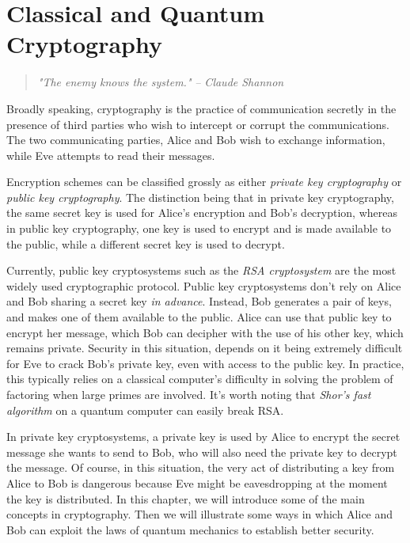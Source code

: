 
\chapter{Classical and Quantum Cryptography} %

\label{Chapter5-cryptography} %


\begin{quote}
\textit{"The enemy knows the system."} 
\bigskip
\hfill \textit{-- Claude Shannon}
\end{quote}

Broadly speaking, cryptography is the practice of communication secretly in the presence of third parties who wish to intercept or corrupt the communications. The two communicating parties, Alice and Bob wish to exchange information, while Eve attempts to read their messages.

Encryption schemes can be classified grossly as either \emph{private key cryptography} or \emph{public key cryptography}. The distinction being that in private key cryptography, the same secret key is used for Alice's encryption and Bob's decryption, whereas in public key cryptography, one key is used to encrypt and is made available to the public, while a different secret key is used to decrypt.

Currently, public key cryptosystems such as the \emph{RSA cryptosystem} are the most widely used cryptographic protocol.  Public key cryptosystems don't rely on Alice and Bob sharing a secret key {\emph{in advance}}. Instead, Bob generates a pair of keys, and makes one of them available to the public. Alice can use that public key to encrypt her message, which Bob can decipher with the use of his other key, which remains private. Security in this situation, depends on it being extremely difficult for Eve to crack Bob's private key, even with access to the public key.  In practice, this typically relies on a classical computer's difficulty in solving the problem of factoring when large primes are involved. It's worth noting that {\emph{Shor's fast algorithm}} on a quantum computer can easily break RSA.

In private key cryptosystems, a private key is used by Alice to encrypt the secret message she wants to send to Bob, who will also need the private key to decrypt the message. Of course, in this situation, the very act of distributing a key from Alice to Bob is dangerous because Eve might be eavesdropping at the moment the key is distributed. In this chapter, we will introduce some of the main concepts in cryptography.  Then we will illustrate some ways in which Alice and Bob can exploit the laws of quantum mechanics to establish better security. 

